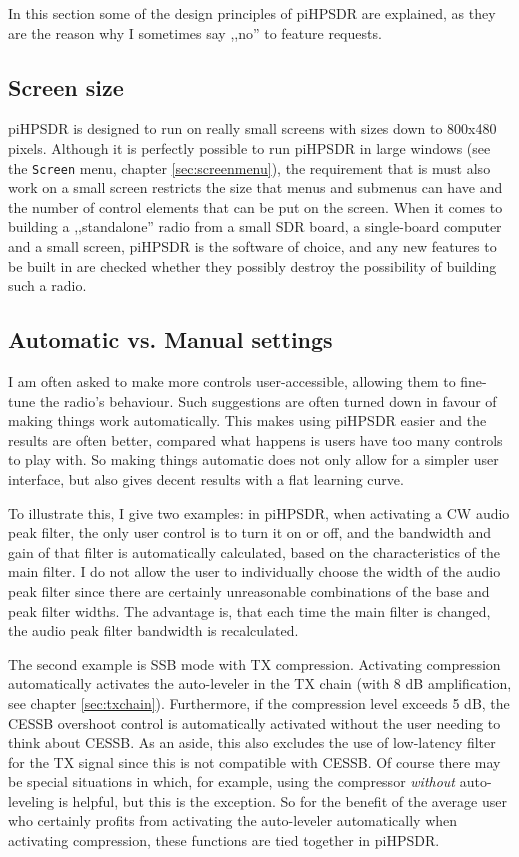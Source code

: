 \documentclass[12pt]{book}
\def\bltt#1{\texttt{\color{blue}#1}}
\def\pH{pi\-HPSDR\xspace}
\begin{document}
In this section some of the design principles of \pH are explained, as they are the reason why I
sometimes say ,,no'' to feature requests.

\subsection{Screen size}
\pH is designed to run on really small screens with sizes down to 800x480 pixels. Although it is
perfectly possible to run \pH in large windows (see the \bltt{Screen} menu, chapter \ref{sec:screenmenu}),
the requirement that is must also work on a small screen restricts the size that menus and submenus
can have and the number of control elements that can be put on the screen. When it comes to building a
,,standalone'' radio from a small SDR board, a single-board computer and a small screen, \pH is
the software of choice, and any new features to be built in are checked whether they possibly
destroy the possibility of building such a radio.

\subsection{Automatic vs. Manual settings}
I am often asked to make more controls user-accessible, allowing them to fine-tune the radio's
behaviour. Such suggestions are often turned down in favour of making things work automatically.
This makes using \pH easier and the results are often better, compared what happens is users
have too many controls to play with. So making things automatic does not only allow for a
simpler user interface, but also gives decent results with a flat learning curve.

To illustrate this, I give two examples: in \pH, when activating a CW audio peak filter, the only
user control is to turn it on or off, and the bandwidth and gain of that filter is automatically
calculated, based on the characteristics of the main filter. I do not allow the user to
individually choose the width of the audio peak filter since there are certainly unreasonable
combinations of the base and peak filter widths. The advantage is, that each time the main filter
is changed, the audio peak filter bandwidth is recalculated.

The second example is SSB mode with TX compression. Activating compression automatically activates
the auto-leveler in the TX chain (with 8 dB amplification, see chapter \ref{sec:txchain}).
Furthermore, if the compression level exceeds 5 dB, the CESSB overshoot control is automatically
activated without the user needing to think about CESSB. As an aside, this also
excludes the use of low-latency filter for the TX signal since this is not compatible with CESSB.
Of course there may be special situations in which, for example, using the compressor
\textit{without} auto-leveling is helpful, but this is the exception. So for the benefit of the
average user who certainly profits from activating the auto-leveler automatically when activating
compression, these functions are tied together in \pH.
\end{document}
